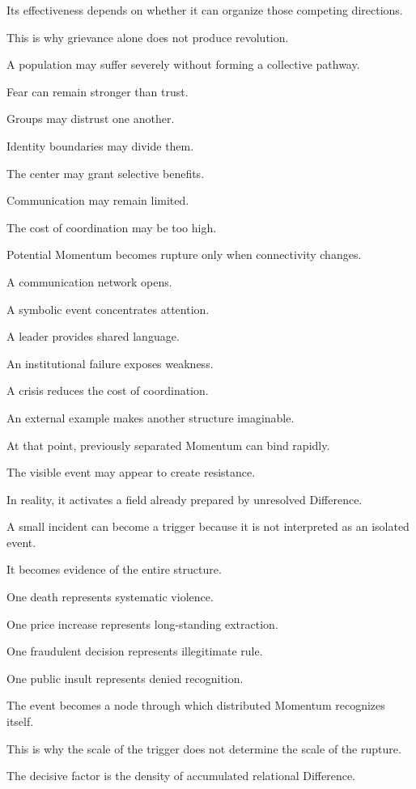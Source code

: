 Its effectiveness depends on whether it can organize those competing directions.

This is why grievance alone does not produce revolution.

A population may suffer severely without forming a collective pathway.

Fear can remain stronger than trust.

Groups may distrust one another.

Identity boundaries may divide them.

The center may grant selective benefits.

Communication may remain limited.

The cost of coordination may be too high.

Potential Momentum becomes rupture only when connectivity changes.

A communication network opens.

A symbolic event concentrates attention.

A leader provides shared language.

An institutional failure exposes weakness.

A crisis reduces the cost of coordination.

An external example makes another structure imaginable.

At that point, previously separated Momentum can bind rapidly.

The visible event may appear to create resistance.

In reality, it activates a field already prepared by unresolved Difference.

A small incident can become a trigger because it is not interpreted as an isolated event.

It becomes evidence of the entire structure.

One death represents systematic violence.

One price increase represents long-standing extraction.

One fraudulent decision represents illegitimate rule.

One public insult represents denied recognition.

The event becomes a node through which distributed Momentum recognizes itself.

This is why the scale of the trigger does not determine the scale of the rupture.

The decisive factor is the density of accumulated relational Difference.

